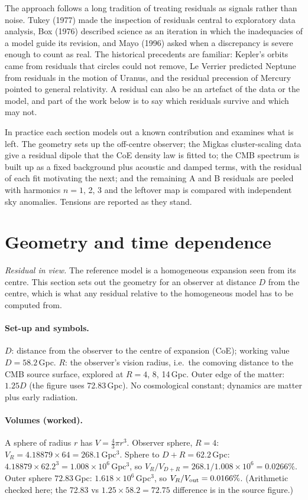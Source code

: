 \documentclass[10pt,twocolumn]{article}
\begin{document}
The approach follows a long tradition of treating residuals as signals rather than noise. Tukey (1977) made the inspection of residuals central to exploratory data analysis, Box (1976) described science as an iteration in which the inadequacies of a model guide its revision, and Mayo (1996) asked when a discrepancy is severe enough to count as real. The historical precedents are familiar: Kepler's orbits came from residuals that circles could not remove, Le Verrier predicted Neptune from residuals in the motion of Uranus, and the residual precession of Mercury pointed to general relativity. A residual can also be an artefact of the data or the model, and part of the work below is to say which residuals survive and which may not.

In practice each section models out a known contribution and examines what is left. The geometry sets up the off-centre observer; the Migkas cluster-scaling data give a residual dipole that the CoE density law is fitted to; the CMB spectrum is built up as a fixed background plus acoustic and damped terms, with the residual of each fit motivating the next; and the remaining A and B residuals are peeled with harmonics $n=1$, 2, 3 and the leftover map is compared with independent sky anomalies. Tensions are reported as they stand.

\section{Geometry and time dependence}
\noindent\emph{Residual in view.} The reference model is a homogeneous expansion seen from its centre. This section sets out the geometry for an observer at distance $D$ from the centre, which is what any residual relative to the homogeneous model has to be computed from.

\paragraph{Set-up and symbols.} $D$: distance from the observer to the centre of expansion (CoE); working value $D=58.2$\,Gpc. $R$: the observer's vision radius, i.e.\ the comoving distance to the CMB source surface, explored at $R=4$, 8, 14\,Gpc. Outer edge of the matter: $1.25D$ (the figure uses 72.83\,Gpc). No cosmological constant; dynamics are matter plus early radiation.

\paragraph{Volumes (worked).} A sphere of radius $r$ has $V=\tfrac43\pi r^3$. Observer sphere, $R=4$: $V_R=4.18879\times64=268.1$\,Gpc$^3$. Sphere to $D+R=62.2$\,Gpc: $4.18879\times62.2^3=1.008\times10^6$\,Gpc$^3$, so $V_R/V_{D+R}=268.1/1.008\times10^6=0.0266\%$. Outer sphere $72.83$\,Gpc: $1.618\times10^6$\,Gpc$^3$, so $V_R/V_{\rm out}=0.0166\%$. (Arithmetic checked here; the 72.83 vs $1.25\times58.2=72.75$ difference is in the source figure.)
\end{document}
